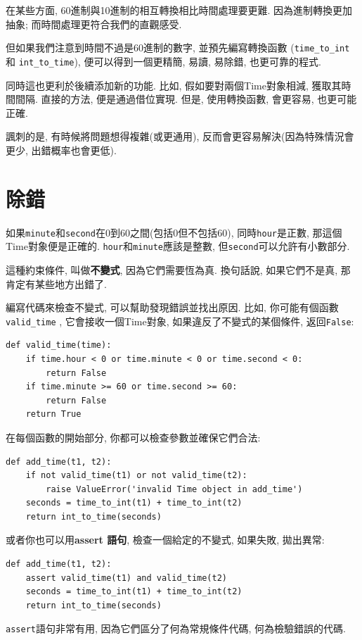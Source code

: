 \documentclass[10pt]{book}
\begin{document}
在某些方面, 60進制與10進制的相互轉換相比時間處理要更難. 
因為進制轉換更加抽象;
而時間處理更符合我們的直觀感受. 

但如果我們注意到時間不過是60進制的數字, 並預先編寫轉換函數 (\verb"time_to_int"
和 \verb"int_to_time"), 便可以得到一個更精簡, 易讀, 易除錯, 也更可靠的程式. 

同時這也更利於後續添加新的功能. 
比如, 假如要對兩個Time對象相減, 獲取其時間間隔. 
直接的方法, 便是通過借位實現. 
但是, 使用轉換函數, 會更容易, 也更可能正確. 

諷刺的是, 有時候將問題想得複雜(或更通用), 反而會更容易解決(因為特殊情況會更少, 
出錯概率也會更低).


\section{除錯}

如果{\tt minute}和{\tt second}在0到60之間(包括0但不包括60),
同時{\tt hour}是正數, 那這個Time對象便是正確的. 
{\tt hour}和{\tt minute}應該是整數, 但{\tt second}可以允許有小數部分. 

這種約束條件, 叫做{\bf 不變式}, 因為它們需要恆為真. 
換句話說, 如果它們不是真, 那肯定有某些地方出錯了. 

編寫代碼來檢查不變式, 可以幫助發現錯誤並找出原因. 
比如, 你可能有個函數\verb"valid_time" , 它會接收一個Time對象, 
如果違反了不變式的某個條件, 返回{\tt False}:

\begin{verbatim}
def valid_time(time):
    if time.hour < 0 or time.minute < 0 or time.second < 0:
        return False
    if time.minute >= 60 or time.second >= 60:
        return False
    return True
\end{verbatim}
%
在每個函數的開始部分, 你都可以檢查參數並確保它們合法:

\begin{verbatim}
def add_time(t1, t2):
    if not valid_time(t1) or not valid_time(t2):
        raise ValueError('invalid Time object in add_time')
    seconds = time_to_int(t1) + time_to_int(t2)
    return int_to_time(seconds)
\end{verbatim}
%
或者你也可以用{\bf assert 語句}, 檢查一個給定的不變式, 如果失敗, 拋出異常:

\begin{verbatim}
def add_time(t1, t2):
    assert valid_time(t1) and valid_time(t2)
    seconds = time_to_int(t1) + time_to_int(t2)
    return int_to_time(seconds)
\end{verbatim}
%
{\tt assert}語句非常有用, 因為它們區分了何為常規條件代碼, 何為檢驗錯誤的代碼. 
\end{document}
